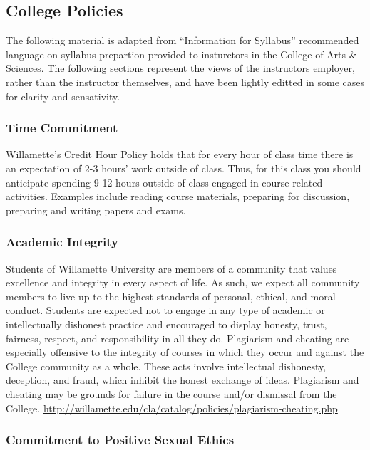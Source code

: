\subsection*{College Policies}

The following material is adapted from ``Information for Syllabus'' recommended language on syllabus prepartion provided to insturctors in the College of Arts \& Sciences.  The following sections represent the views of the instructors employer, rather than the instructor themselves, and have been lightly editted in some cases for clarity and sensativity.

\subsubsection*{Time Commitment}

Willamette's Credit Hour Policy holds that for every hour of class time there is an expectation of 2-3 hours’ work outside of class.  Thus, for this class you should anticipate spending 9-12 hours outside of class engaged in course-related activities. Examples include reading course materials, preparing for discussion, preparing and writing papers and exams.

\subsubsection*{Academic Integrity}

Students of Willamette University are members of a community that values excellence and integrity in every aspect of life. As such, we expect all community members to live up to the highest standards of personal, ethical, and moral conduct. Students are expected not to engage in any type of academic or intellectually dishonest practice and encouraged to display honesty, trust, fairness, respect, and responsibility in all they do. Plagiarism and cheating are especially offensive to the integrity of courses in which they occur and against the College community as a whole. These acts involve intellectual dishonesty, deception, and fraud, which inhibit the honest exchange of ideas. Plagiarism and cheating may be grounds for failure in the course and/or dismissal from the College. \url{http://willamette.edu/cla/catalog/policies/plagiarism-cheating.php}

\subsubsection*{Commitment to Positive Sexual Ethics}

